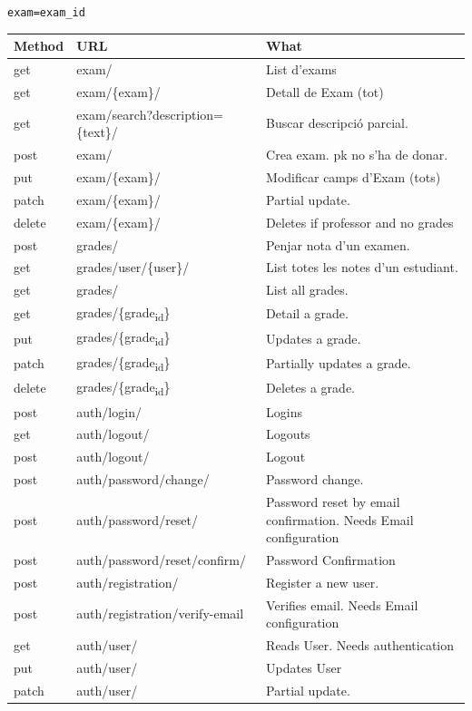 \documentclass[11pt]{article}
\begin{document}
\texttt{exam=exam\_id}
\begin{table}[htbp]
\label{Methods table. Preceeded by api at ngix level}
\centering
\begin{tabular}{lll}
\hline
Method & URL & What\\
\hline
get & exam/ & List d'exams\\
get & exam/\{exam\}/ & Detall de Exam (tot)\\
get & exam/search?description=\{text\}/ & Buscar descripció parcial.\\
post & exam/ & Crea exam. pk no s'ha de donar.\\
put & exam/\{exam\}/ & Modificar camps d'Exam (tots)\\
patch & exam/\{exam\}/ & Partial update.\\
delete & exam/\{exam\}/ & Deletes if professor and no grades\\
\hline
post & grades/ & Penjar nota d'un examen.\\
get & grades/user/\{user\}/ & List totes les notes d'un estudiant.\\
get & grades/ & List all grades.\\
get & grades/\{grade\textsubscript{id}\} & Detail a grade.\\
put & grades/\{grade\textsubscript{id}\} & Updates a grade.\\
patch & grades/\{grade\textsubscript{id}\} & Partially updates a grade.\\
delete & grades/\{grade\textsubscript{id}\} & Deletes a grade.\\
\hline
post & auth/login/ & Logins\\
get & auth/logout/ & Logouts\\
post & auth/logout/ & Logout\\
post & auth/password/change/ & Password change.\\
post & auth/password/reset/ & Password reset by email confirmation. Needs Email configuration\\
post & auth/password/reset/confirm/ & Password Confirmation\\
post & auth/registration/ & Register a new user.\\
post & auth/registration/verify-email & Verifies email. Needs Email configuration\\
get & auth/user/ & Reads User. Needs authentication\\
put & auth/user/ & Updates User\\
patch & auth/user/ & Partial update.\\
\hline
\end{tabular}
\end{table}
\end{document}
